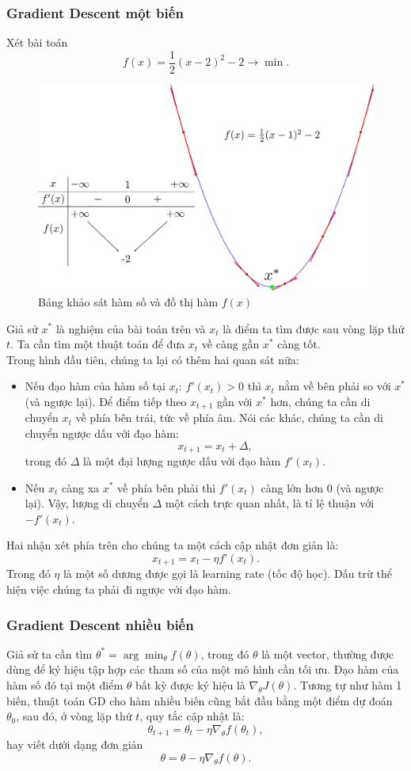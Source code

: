 \documentclass[]{article}
\begin{document}
\subsubsection{Gradient Descent một biến}
Xét bài toán $$f(x)=\frac{1}{2}(x-2)^2-2\to \min.$$
\begin{figure}[h!]
	\centering
	\includegraphics[width=0.8\linewidth]{gradient_descent}
	\caption{Bảng khảo sát hàm số và đồ thị hàm $f(x)$}
\end{figure}
\noindent Giả sử $x^*$ là nghiệm của bài toán trên và $x_t$ là điểm ta tìm được sau vòng lặp thứ $t$. Ta cần tìm một thuật toán để đưa $x_t$ về càng gần $x^*$ càng tốt.
\\
Trong hình đầu tiên, chúng ta lại có thêm hai quan sát nữa:
\begin{itemize}
	\item Nếu đạo hàm của hàm số tại $x_t:\, f'(x_t)>0$ thì $x_t$ 	nằm về bên phải so với $x^*$ (và ngược lại). Để điểm tiếp theo $x_{t+1}$ gần với $x^*$ hơn, chúng ta cần di chuyển $x_t$ về phía bên trái, tức về phía âm. Nói các khác, chúng ta cần di chuyển ngược dấu với đạo hàm:
	$$x_{t+1} = x_{t} + \Delta,$$
	trong đó $\Delta$ là một đại lượng ngược dấu với đạo hàm $f'(x_t)$.
	\item Nếu $x_t$ càng xa $x^*$ về phía bên phải thì $f'(x_t)$ càng lớn hơn 0 (và ngược lại). Vậy, lượng di chuyển $\Delta$ một cách trực quan nhất, là tỉ lệ thuận với $-f'(x_t)$.
\end{itemize}
Hai nhận xét phía trên cho chúng ta một cách cập nhật đơn giản là:
$$x_{t+1} = x_{t} - \eta f’(x_{t}).$$
Trong đó $\eta$ là một số dương được gọi là learning rate (tốc độ học). Dấu trừ thể hiện việc chúng ta phải đi ngược với đạo hàm.

\subsubsection{Gradient Descent nhiều biến}
Giả sử ta cần tìm $\theta^*=\arg\min_{\theta}f(\theta)$, trong đó $\theta$ là một vector, thường được dùng để ký hiệu tập hợp các tham số của một mô hình cần tối ưu. Đạo hàm của hàm số đó tại một điểm $\theta$ bất kỳ được ký hiệu là $\nabla_\theta J(\theta)$. Tương tự như hàm 1 biến, thuật toán GD cho hàm nhiều biến cũng bắt đầu bằng một điểm dự đoán $\theta_0$, sau đó, ở vòng lặp thứ $t$, quy tắc cập nhật là:
$$\theta_{t+1} = \theta_{t} - \eta \nabla_{\theta} f(\theta_{t}),$$
hay viết dưới dạng đơn giản
$$\theta = \theta - \eta \nabla_{\theta} f(\theta).$$
\end{document}
